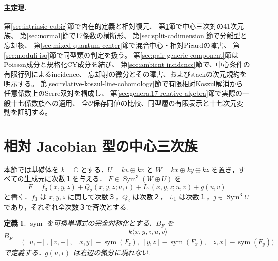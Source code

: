 \documentclass[11pt,a4paper]{ltjsarticle}
\numberwithin{equation}{section}
\newtheorem{definition}[theorem]{定義}
\newcommand{\C}{\mathbb C}
\newcommand{\Sym}{\operatorname{Sym}}
\newcommand{\Symm}{\operatorname{sym}}
\begin{document}
\paragraph{主定理.}
第\ref{sec:intrinsic-cubic}節で内在的定義と相対復元、
第\ref{sec:construction}節で中心三次対の41次元族、
第\ref{sec:normal}節で17係数の横断形、
第\ref{sec:split-codimension}節で分離型と忘却核、
第\ref{sec:mixed-quantum-center}節で混合中心・相対Picardの障害、
第\ref{sec:moduli-iso}節で同型類の判定を扱う。
第\ref{sec:pair-generic-component}節はPoisson成分と規格化CY成分を結び、
第\ref{sec:ambient-incidence}節で、中心条件の有限行列によるincidence、
忘却射の微分とその障害、およびstackの次元規約を明示する。
第\ref{sec:relative-koszul-line-cohomology}節で有限相対Koszul解消から
任意係数上のSerre双対を構成し、
第\ref{sec:general17-relative-algebra}節で実際の一般十七係数族への適用、
全$\mathcal O$保存同値の比較、同型層の有限表示と十七次元変動を証明する。








\section{相対 Jacobian 型の中心三次族}\label{sec:construction}
本節では基礎体を $k=\C$ とする．$U=ku\oplus kv$ と
$W=kx\oplus ky\oplus kz$ を置き，すべての生成元に次数１を与える．
$F\in\Sym^3(W\oplus U)$ を
\begin{equation}\label{eq:Ffull}
 F=f_3(x,y,z)+Q_2(x,y,z;u,v)+L_1(x,y,z;u,v)+g(u,v)
\end{equation}
と書く．$f_3$ は $x,y,z$ に関して次数３，$Q_2$ は次数２，
$L_1$ は次数１，$g\in\Sym^3U$ であり，それぞれ全次数３で斉次とする．

\begin{definition}\label{def:B}
$\Symm$ を可換単項式の完全対称化とする．$B_F$ を
\begin{equation}\label{eq:B}
 B_F=\frac{k\langle x,y,z,u,v\rangle}{
 \bigl([u,-],[v,-],\ [x,y]-\Symm(F_z),\
 [y,z]-\Symm(F_x),\ [z,x]-\Symm(F_y)\bigr)}
\end{equation}
で定義する．$g(u,v)$ は右辺の微分に現れない．
\end{definition}
\end{document}
